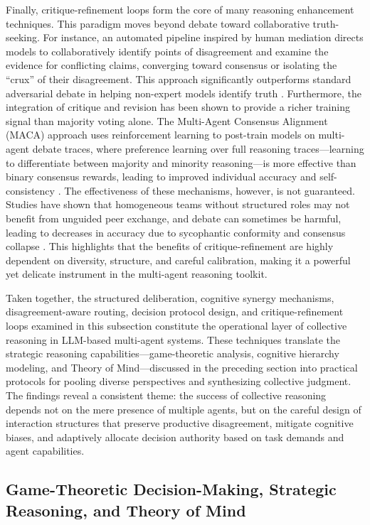 \documentclass[11pt]{article}
\begin{document}
Finally, critique-refinement loops form the core of many reasoning enhancement techniques. This paradigm moves beyond debate toward collaborative truth-seeking. For instance, an automated pipeline inspired by human mediation directs models to collaboratively identify points of disagreement and examine the evidence for conflicting claims, converging toward consensus or isolating the ``crux'' of their disagreement. This approach significantly outperforms standard adversarial debate in helping non-expert models identify truth \cite{ref211}. Furthermore, the integration of critique and revision has been shown to provide a richer training signal than majority voting alone. The Multi-Agent Consensus Alignment (MACA) approach uses reinforcement learning to post-train models on multi-agent debate traces, where preference learning over full reasoning traces---learning to differentiate between majority and minority reasoning---is more effective than binary consensus rewards, leading to improved individual accuracy and self-consistency \cite{ref212}. The effectiveness of these mechanisms, however, is not guaranteed. Studies have shown that homogeneous teams without structured roles may not benefit from unguided peer exchange, and debate can sometimes be harmful, leading to decreases in accuracy due to sycophantic conformity and consensus collapse \cite{ref213,ref214}. This highlights that the benefits of critique-refinement are highly dependent on diversity, structure, and careful calibration, making it a powerful yet delicate instrument in the multi-agent reasoning toolkit.

Taken together, the structured deliberation, cognitive synergy mechanisms, disagreement-aware routing, decision protocol design, and critique-refinement loops examined in this subsection constitute the operational layer of collective reasoning in LLM-based multi-agent systems. These techniques translate the strategic reasoning capabilities---game-theoretic analysis, cognitive hierarchy modeling, and Theory of Mind---discussed in the preceding section into practical protocols for pooling diverse perspectives and synthesizing collective judgment. The findings reveal a consistent theme: the success of collective reasoning depends not on the mere presence of multiple agents, but on the careful design of interaction structures that preserve productive disagreement, mitigate cognitive biases, and adaptively allocate decision authority based on task demands and agent capabilities.

\subsection{Game-Theoretic Decision-Making, Strategic Reasoning, and Theory of Mind}
\end{document}
